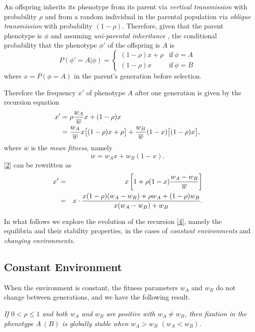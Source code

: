 \documentclass[9pt,twocolumn,twoside,lineno]{pnas-new}
\newcommand{\an}[1]{\begin{align}#1\end{align}}
\begin{document}
An offspring inherits its phenotype from its parent via {\sl vertical transmission} with probability $\rho$ and from a random individual in the parental population via {\sl oblique transmission} with probability $(1-\rho)$. Therefore, given that the parent phenotype is $\phi$ and assuming {\sl uni-parental inheritance} \cite{zefferman2016mothers}, the conditional probability that the phenotype $\phi'$ of the offspring is $A$ is
\begin{equation}
P(\phi' =A|\phi) =\left\{\begin{array}{cc}(1-\rho)x+\rho &\mbox{if}\ \phi=A\\ 
 (1-\rho)x & \mbox{if}\ \phi =B\end{array}\right.
 \end{equation}
 where $x=P(\phi=A)$ in the parent's generation before selection.
 
 Therefore the frequency $x'$ of  phenotype $A$ after one generation is given by the recursion equation
 \begin{equation}
 \an{
 x'&=\rho{w_A\over \overline w}x +(1-\rho)x\\
 &=     {w_A\over \overline w}x\bigl[(1-\rho)x +\rho\bigr] +{w_B\over \overline w}(1-x)\bigl[(1-\rho)x\bigr],}
 \label{2}\end{equation}
 where $\overline w$ is the {\sl mean fitness}, namely
 \begin{equation}\overline w=w_A x+w_B(1-x).\end{equation}
 \eqref{2} can be rewritten as
 \begin{equation}
 \an{
 x' &=& x\left[1+\rho(1-x){w_A-w_B\over \overline w}\right]\\
     &=&x\cdot{x(1-\rho)(w_A-w_B) +\rho w_A +(1-\rho)w_B\over x(w_A-w_B) +w_B}.}
    \label{4} \end{equation}
 
 In what follows we explore the evolution of the recursion \eqref{4}, namely the equilibria and their stability properties, in the cases of {\sl constant environments} and {\sl changing environments}.

 \subsection{Constant Environment}

When the environment is constant, the fitness parameters $w_A$ and $w_B$ do not change between generations, and we have the following result.
\medskip

 {\sl If $0<\rho\le 1$ and both $w_A$ and $w_B$ are positive with $w_A\ne w_B$, then fixation in the phenotype $A\ (B)$ is globally stable when $w_A>w_B$ $(w_A<w_B)$.}\par
\medskip
\end{document}
